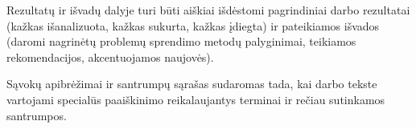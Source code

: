 \documentclass{VUMIFPSkursinis}
\begin{document}
Rezultatų ir išvadų dalyje turi būti aiškiai išdėstomi pagrindiniai darbo
rezultatai (kažkas išanalizuota, kažkas sukurta, kažkas įdiegta) ir pateikiamos
išvados (daromi nagrinėtų problemų sprendimo metodų palyginimai, teikiamos
rekomendacijos, akcentuojamos naujovės).

\printbibliography[heading=bibintoc]  %

Sąvokų apibrėžimai ir santrumpų sąrašas sudaromas tada, kai darbo tekste
vartojami specialūs paaiškinimo reikalaujantys terminai ir rečiau sutinkamos
santrumpos.

\appendix  %
\end{document}

